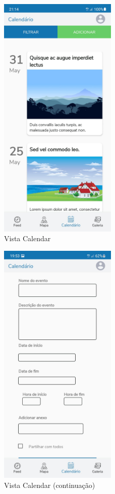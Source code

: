 \documentclass[12pt]{report}
\begin{document}
\begin{itemize}
    \bigskip
    \begin{figure}[H]
        \centering
        \includegraphics[width=0.5\textwidth]{img/view-calendar-1.png}
        \caption{Vista Calendar}
    \end{figure}
    
    \bigskip
    \begin{figure}[H]
        \centering
        \includegraphics[width=0.5\textwidth]{img/view-calendar-2.png}
        \caption{Vista Calendar (continuação)}
    \end{figure}

\end{itemize}
\end{document}

